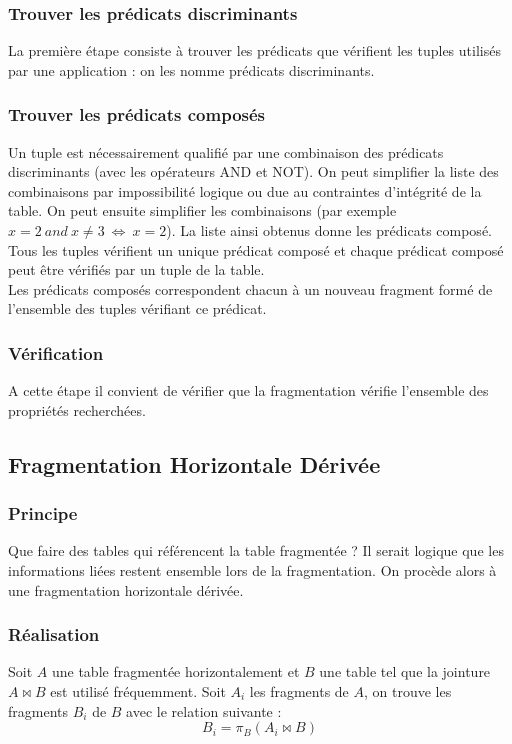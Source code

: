 \documentclass[10pt,a4paper,twoside]{article}
\begin{document}
\subsubsection{Trouver les prédicats discriminants}
La première étape consiste à trouver les prédicats que vérifient les tuples utilisés par une application : on les nomme prédicats discriminants.

\subsubsection{Trouver les prédicats composés}
Un tuple est nécessairement qualifié par une combinaison des prédicats discriminants (avec les opérateurs AND et NOT). On peut simplifier la liste des combinaisons par impossibilité logique ou due au contraintes d'intégrité de la table. On peut ensuite simplifier les combinaisons (par exemple $x=2\ and\ x\neq 3\ \Leftrightarrow\ x=2$). La liste ainsi obtenus donne les prédicats composé. Tous les tuples vérifient un unique prédicat composé et chaque prédicat composé peut être vérifiés par un tuple de la table.\\
Les prédicats composés correspondent chacun à un nouveau fragment formé de l'ensemble des tuples vérifiant ce prédicat.

\subsubsection{Vérification}
A cette étape il convient de vérifier que la fragmentation vérifie l'ensemble des propriétés recherchées.

\subsection{Fragmentation Horizontale Dérivée}
\subsubsection{Principe}
Que faire des tables qui référencent la table fragmentée ? Il serait logique que les informations liées restent ensemble lors de la fragmentation. On procède alors à une fragmentation horizontale dérivée.

\subsubsection{Réalisation}
Soit $A$ une table fragmentée horizontalement et $B$ une table tel que la jointure $A\bowtie B$ est utilisé fréquemment. Soit $A_{i}$ les fragments de $A$, on trouve les fragments $B_{i}$ de $B$ avec le relation suivante :
$$B_{i} = \pi_{B}(A_{i}\bowtie B)$$
\end{document}
